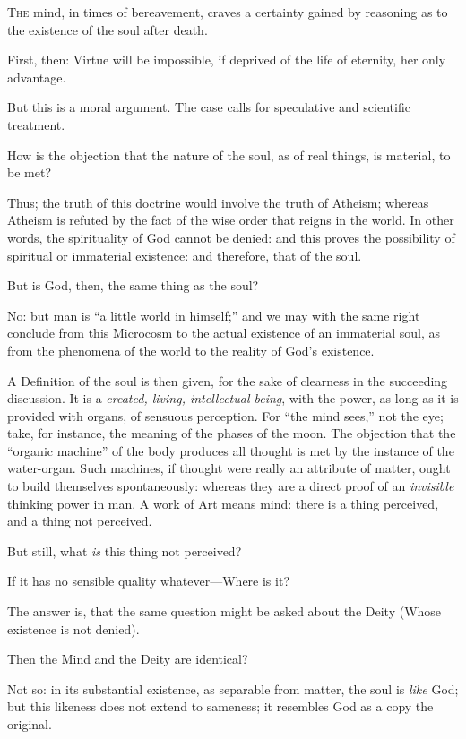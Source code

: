 
\textsc{The} mind, in times of bereavement, craves a certainty gained by reasoning as to the existence of the soul after death.

First, then: Virtue will be impossible, if deprived of the life of eternity, her only advantage.

But this is a moral argument. The case calls for speculative and scientific treatment.

How is the objection that the nature of the soul, as of real things, is material, to be met?

Thus; the truth of this doctrine would involve the truth of Atheism; whereas Atheism is refuted by the fact of the wise order that reigns in the world. In other words, the spirituality of God cannot be denied: and this proves the possibility of spiritual or immaterial existence: and therefore, that of the soul.

But is God, then, the same thing as the soul?

No: but man is “a little world in himself;” and we may with the same right conclude from this Microcosm to the actual existence of an immaterial soul, as from the phenomena of the world to the reality of God’s existence.

A Definition of the soul is then given, for the sake of clearness in the succeeding discussion. It is a \emph{created, living, intellectual being}, with the power, as long as it is provided with organs, of sensuous perception. For “the mind sees,” not the eye; take, for instance, the meaning of the phases of the moon. The objection that the “organic machine” of the body produces all thought is met by the instance of the water-organ. Such machines, if thought were really an attribute of matter, ought to build themselves spontaneously: whereas they are a direct proof of an \emph{invisible} thinking power in man. A work of Art means mind: there is a thing perceived, and a thing not perceived.

But still, what \emph{is} this thing not perceived?

If it has no sensible quality whatever—Where is it?

The answer is, that the same question might be asked about the Deity (Whose existence is not denied).

Then the Mind and the Deity are identical?

Not so: in its substantial existence, as separable from matter, the soul is \emph{like} God; but this likeness does not extend to sameness; it resembles God as a copy the original.

